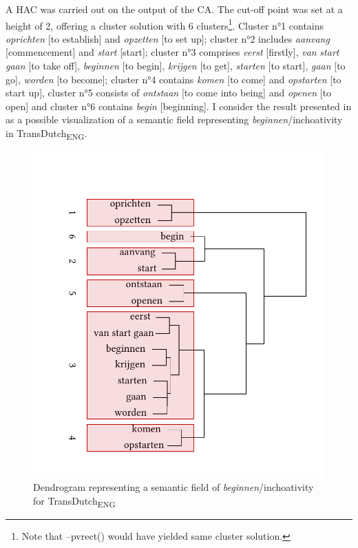 A HAC was carried out on the output of the CA. The cut-off point was set at a height of 2, offering a cluster solution with 6 clusters\footnote{Note that –pvrect() would have yielded same cluster solution.}. Cluster n°1 contains \textit{oprichten} [to establish] and \textit{opzetten} [to set up]; cluster n°2 includes \textit{aanvang} [commencement] and \textit{start} [start]; cluster n°3 comprises \textit{eerst} [firstly], \textit{van} \textit{start} \textit{gaan} [to take off], \textit{beginnen} [to begin], \textit{krijgen} [to get], \textit{starten} [to start], \textit{gaan} [to go], \textit{worden} [to become]; cluster n°4 contains \textit{komen} [to come] and \textit{opstarten} [to start up], cluster n°5 consists of \textit{ontstaan} [to come into being] and \textit{openen} [to open] and cluster n°6 contains \textit{begin} [beginning]. I consider the result presented in  as a possible visualization of a semantic field representing \textit{beginnen}/inchoativity in TransDutch\textsubscript{ENG}.

\begin{figure}
\includegraphics[width=\textwidth]{figures/tree65.pdf}
\caption{\label{fig:4:64}  Dendrogram representing a semantic field of \textit{beginnen}/inchoativity for TransDutch\textsubscript{ENG}}
\end{figure}

